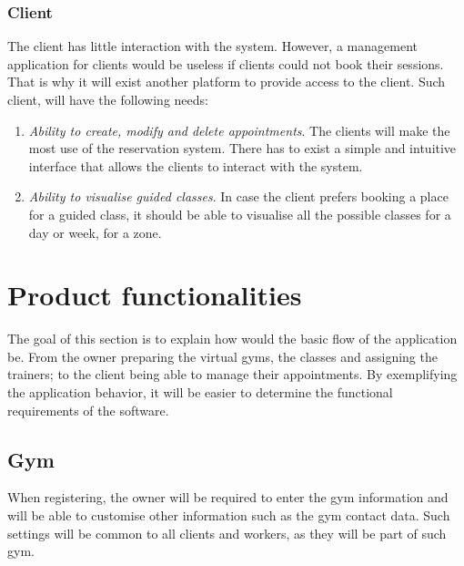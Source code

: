 \documentclass[a4paper, 12pt, oneside]{book}
\begin{document}
\subsubsection{Client}
The client has little interaction with the system. However, a management application for clients would be useless if clients could not book their sessions. That is why it will exist another platform to provide access to the client. Such client, will have the following needs:
\begin{enumerate}[label = -]
	\item \emph{Ability to create, modify and delete appointments}. The clients will make the most use of the reservation system. There has to exist a simple and intuitive interface that allows the clients to interact with the system.
	\item \emph{Ability to visualise guided classes}. In case the client prefers booking a place for a guided class, it should be able to visualise all the possible classes for a day or week, for a zone.
\end{enumerate}
\section{Product functionalities}
The goal of this section is to explain how would the basic flow of the application be. From the owner preparing the virtual gyms, the classes and assigning the trainers; to the client being able to manage their appointments. By exemplifying the application behavior, it will be easier to determine the functional requirements of the software.
\subsection{Gym}
When registering, the owner will be required to enter the gym information and will be able to customise other information such as the gym contact data. Such settings will be common to all clients and workers, as they will be part of such gym.
\end{document}
